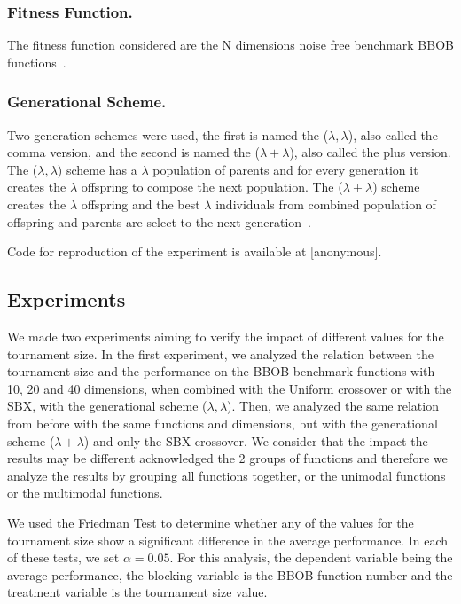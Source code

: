 \subsubsection*{Fitness Function.}
The fitness function considered are the N dimensions noise free benchmark BBOB functions~\cite{hansen2010real}.





\subsubsection*{Generational Scheme.}
Two generation schemes were used, the first is named the ($\lambda, \lambda$), also called the comma version, and the second is named the ($\lambda + \lambda$), also called the plus version. The ($\lambda, \lambda$) scheme has a $\lambda$ population of parents and for every generation it creates the $\lambda$ offspring to compose the next population. The ($\lambda + \lambda$) scheme creates the $\lambda$ offspring and the best $\lambda$ individuals from combined population of offspring and parents are select to the next generation~\cite{pilat2017parallel}.

Code for reproduction of the experiment is available at [anonymous].

\subsection{Experiments}\label{sec:experiment}
We made two experiments aiming to verify the impact of different values for the tournament size. In the first experiment, we analyzed the relation between the tournament size and the performance on the BBOB benchmark functions with 10, 20 and 40 dimensions, when combined with the Uniform crossover or with the SBX, with the generational scheme  ($\lambda, \lambda$). Then, we analyzed the same relation from before with the same functions and dimensions, but with the generational scheme  ($\lambda + \lambda$) and only the SBX crossover. We consider that the impact the results may be different acknowledged the 2 groups of functions and therefore we analyze the results by grouping all functions together, or the unimodal functions or the multimodal functions. 

We used the Friedman Test to determine whether any of the values for the tournament size show a significant difference in the average performance. In each of these tests, we set $\alpha = 0.05$. For this analysis, the dependent variable being the average performance, the blocking variable is the BBOB function number and the treatment variable is the tournament size value.



